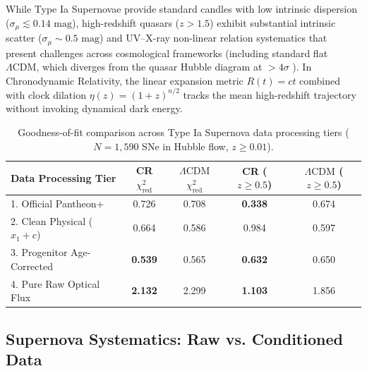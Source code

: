 \documentclass[aps,prd,reprint,superscriptaddress,nofootinbib,floatfix,amsmath,amssymb]{revtex4-2}
\begin{document}
While Type Ia Supernovae provide standard candles with low intrinsic dispersion ($\sigma_\mu \lesssim 0.14\text{ mag}$), high-redshift quasars ($z > 1.5$) exhibit substantial intrinsic scatter ($\sigma_\mu \sim 0.5\text{ mag}$) and UV--X-ray non-linear relation systematics that present challenges across cosmological frameworks (including standard flat $\Lambda\text{CDM}$, which diverges from the quasar Hubble diagram at $>4\sigma$ \cite{RisalitiLusso2019,Lusso2020}). In Chronodynamic Relativity, the linear expansion metric $R(t) = ct$ combined with clock dilation $\eta(z) = (1+z)^{n/2}$ tracks the mean high-redshift trajectory without invoking dynamical dark energy.

\begin{table}[!t]
\caption{Goodness-of-fit comparison across Type Ia Supernova data processing tiers ($N=1,590$ SNe in Hubble flow, $z \ge 0.01$).}
\label{tab:sne_tiers}
\begin{ruledtabular}
\begin{tabular}{lcccc}
Data Processing Tier & CR $\chi^2_{\text{red}}$ & $\Lambda\text{CDM}$ $\chi^2_{\text{red}}$ & CR ($z \ge 0.5$) & $\Lambda\text{CDM}$ ($z \ge 0.5$) \\
\hline
1. Official Pantheon+ & 0.726 & 0.708 & \textbf{0.338} & 0.674 \\
2. Clean Physical ($x_1+c$) & 0.664 & 0.586 & 0.984 & 0.597 \\
3. Progenitor Age-Corrected & \textbf{0.539} & 0.565 & \textbf{0.632} & 0.650 \\
4. Pure Raw Optical Flux & \textbf{2.132} & 2.299 & \textbf{1.103} & 1.856 \\
\end{tabular}
\end{ruledtabular}
\end{table}

\subsection{Supernova Systematics: Raw vs. Conditioned Data}
\end{document}
